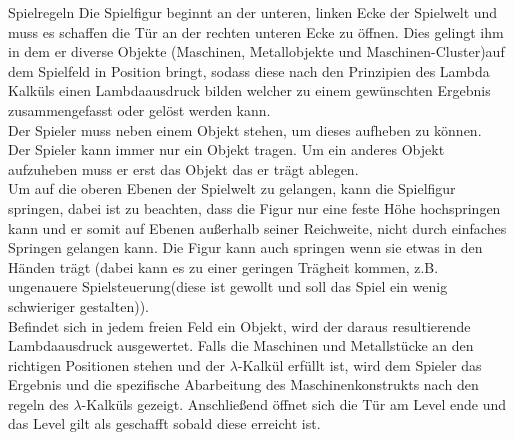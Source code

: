 \documentclass{scrartcl}
\begin{document}
\begin{description}

\begin{minipage}{1\textwidth}
	\item[Spielregeln] \label{spielaufbau:Spielregeln} 
	Die Spielfigur beginnt an der unteren, linken Ecke der Spielwelt und muss es schaffen die Tür an der rechten unteren Ecke zu öffnen. Dies gelingt ihm in dem er diverse Objekte (Maschinen, Metallobjekte und Maschinen-Cluster)auf dem Spielfeld in Position bringt, sodass diese nach den Prinzipien des Lambda Kalküls einen Lambdaausdruck bilden  welcher zu einem gewünschten Ergebnis zusammengefasst oder gelöst werden kann.\\
	Der Spieler muss neben einem Objekt stehen, um dieses aufheben zu können.\\
	Der Spieler kann immer nur ein Objekt tragen. Um ein anderes Objekt aufzuheben muss er erst das Objekt das er trägt ablegen.\\
	Um auf die oberen Ebenen der Spielwelt zu gelangen, kann die Spielfigur springen, dabei ist zu beachten, dass die Figur nur eine feste Höhe hochspringen kann und er somit auf Ebenen außerhalb seiner Reichweite, nicht durch einfaches Springen gelangen kann. Die Figur kann auch springen wenn sie etwas in den Händen trägt (dabei kann es zu einer geringen Trägheit kommen, z.B. ungenauere Spielsteuerung(diese ist gewollt und soll das Spiel ein wenig schwieriger gestalten)).\\
	Befindet sich in jedem freien Feld ein Objekt, wird der daraus resultierende Lambdaausdruck ausgewertet. Falls die Maschinen und Metallstücke an den richtigen Positionen stehen und der $\lambda$-Kalkül erfüllt ist, wird dem Spieler das Ergebnis und die spezifische Abarbeitung des Maschinenkonstrukts nach den regeln des $\lambda$-Kalküls gezeigt. Anschließend öffnet sich die Tür am Level ende und das Level gilt als geschafft sobald diese erreicht ist.\\
	
\end{minipage}


\end{description}
\end{document}

